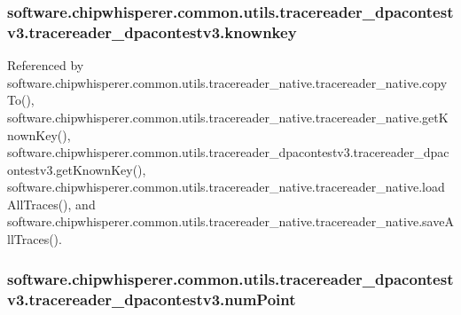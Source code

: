 \hypertarget{classsoftware_1_1chipwhisperer_1_1common_1_1utils_1_1tracereader__dpacontestv3_1_1tracereader__dpacontestv3_a91779c621e952e9164b8f1314eec28d5}{}
\subsubsection[{knownkey}]{\setlength{\rightskip}{0pt plus 5cm}software.\+chipwhisperer.\+common.\+utils.\+tracereader\+\_\+dpacontestv3.\+tracereader\+\_\+dpacontestv3.\+knownkey}\label{classsoftware_1_1chipwhisperer_1_1common_1_1utils_1_1tracereader__dpacontestv3_1_1tracereader__dpacontestv3_a91779c621e952e9164b8f1314eec28d5}


Referenced by software.\+chipwhisperer.\+common.\+utils.\+tracereader\+\_\+native.\+tracereader\+\_\+native.\+copy\+To(), software.\+chipwhisperer.\+common.\+utils.\+tracereader\+\_\+native.\+tracereader\+\_\+native.\+get\+Known\+Key(), software.\+chipwhisperer.\+common.\+utils.\+tracereader\+\_\+dpacontestv3.\+tracereader\+\_\+dpacontestv3.\+get\+Known\+Key(), software.\+chipwhisperer.\+common.\+utils.\+tracereader\+\_\+native.\+tracereader\+\_\+native.\+load\+All\+Traces(), and software.\+chipwhisperer.\+common.\+utils.\+tracereader\+\_\+native.\+tracereader\+\_\+native.\+save\+All\+Traces().

\hypertarget{classsoftware_1_1chipwhisperer_1_1common_1_1utils_1_1tracereader__dpacontestv3_1_1tracereader__dpacontestv3_aa7ffea1a81cb6b4f4e6b6b9f7cf56350}{}
\subsubsection[{num\+Point}]{\setlength{\rightskip}{0pt plus 5cm}software.\+chipwhisperer.\+common.\+utils.\+tracereader\+\_\+dpacontestv3.\+tracereader\+\_\+dpacontestv3.\+num\+Point}\label{classsoftware_1_1chipwhisperer_1_1common_1_1utils_1_1tracereader__dpacontestv3_1_1tracereader__dpacontestv3_aa7ffea1a81cb6b4f4e6b6b9f7cf56350}


